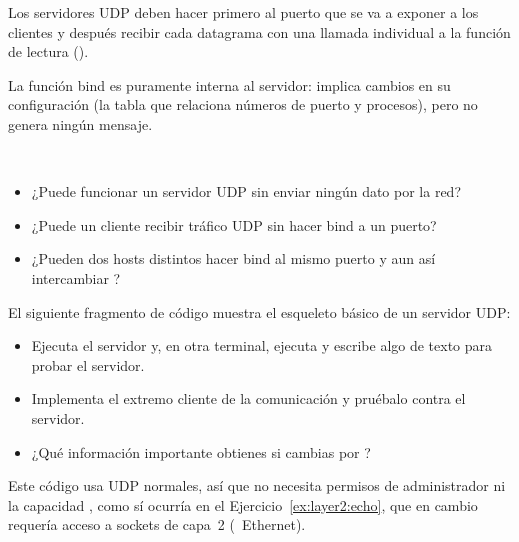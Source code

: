 Los servidores UDP deben hacer primero  al puerto que se va a exponer a los clientes y después
recibir cada datagrama con una llamada individual a la función de lectura ().

La función bind es puramente interna al servidor: implica cambios en su configuración
(la tabla que relaciona números de puerto y procesos), pero no genera ningún mensaje.

\begin{exercise}\ \\[-0.5cm]
\begin{itemize}
\item ¿Puede funcionar un servidor UDP sin enviar ningún dato por la red?
\item ¿Puede un cliente recibir tráfico UDP sin hacer bind a un puerto?
\item ¿Pueden dos hosts distintos hacer bind al mismo puerto y aun así intercambiar ?
\end{itemize}
\end{exercise}


\begin{exercise}
El siguiente fragmento de código muestra el esqueleto básico de un servidor UDP:

\begin{center}
\end{center}

\begin{itemize}
\item Ejecuta el servidor y, en otra terminal, ejecuta  y escribe algo de texto para probar
  el servidor.
\item Implementa el extremo cliente de la comunicación y pruébalo contra el servidor.
\item ¿Qué información importante obtienes si cambias  por ?
\end{itemize}

\begin{remark}
Este código usa  UDP normales, así que no necesita permisos de administrador
ni la capacidad , como sí ocurría en el Ejercicio~\ref{ex:layer2:echo},
que en cambio requería acceso a sockets de capa~2 (\eg\ Ethernet).
\end{remark}
\end{exercise}

